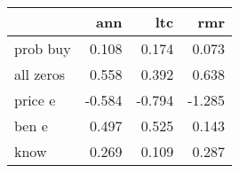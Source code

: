\begin{tabular}{lrrr}
\toprule
{} &    ann &    ltc &    rmr \\
\midrule
prob buy  &  0.108 &  0.174 &  0.073 \\
all zeros &  0.558 &  0.392 &  0.638 \\
price e   & -0.584 & -0.794 & -1.285 \\
ben e     &  0.497 &  0.525 &  0.143 \\
know      &  0.269 &  0.109 &  0.287 \\
\bottomrule
\end{tabular}
